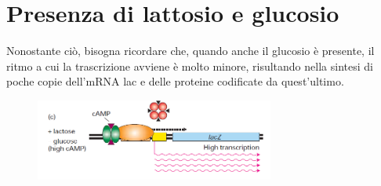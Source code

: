 \documentclass[10pt,a4paper]{article}
\begin{document}
	
	\section{Presenza di lattosio e glucosio}
	
	Nonostante ciò, bisogna ricordare che, quando anche il glucosio è presente, il ritmo a cui la trascrizione avviene è molto minore, risultando nella sintesi di poche copie dell'mRNA lac e delle proteine codificate da quest'ultimo.
	
	\begin{figure}[h]
		\centering
		\includegraphics[width=0.7\textwidth]{operone no glu.png}
	\end{figure}
	
	
\end{document}
